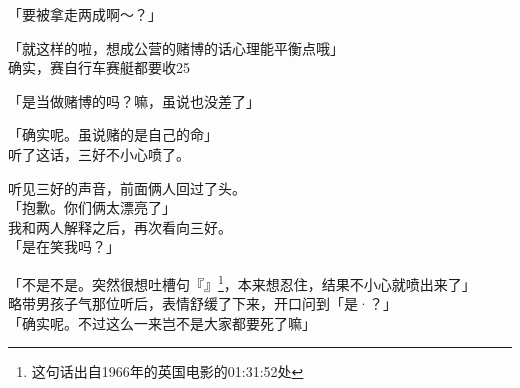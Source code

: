 「要被拿走两成啊～？」

「就这样的啦，想成公营的赌博的话心理能平衡点哦」\\

确实，赛自行车赛艇都要收25%

「是当做赌博的吗？嘛，虽说也没差了」

「确实呢。虽说赌的是自己的命」\\

听了这话，三好不小心喷了。

听见三好的声音，前面俩人回过了头。\\

「抱歉。你们俩太漂亮了」\\

我和两人解释之后，再次看向三好。\\

「是在笑我吗？」

「不是不是。突然很想吐槽句『』\footnote{这句话出自1966年的英国电影的01:31:52处}，本来想忍住，结果不小心就喷出来了」\\

略带男孩子气那位听后，表情舒缓了下来，开口问到「是·？」\\

「确实呢。不过这么一来岂不是大家都要死了嘛」\\

